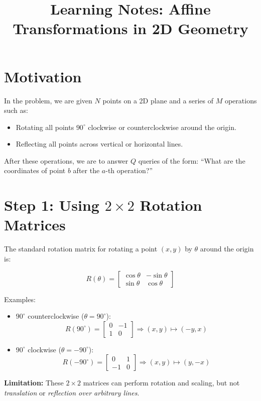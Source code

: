 \documentclass[12pt]{article}
\title{Learning Notes: Affine Transformations in 2D Geometry}
\author{}
\date{}
\begin{document}
\maketitle

\section*{Motivation}
In the problem, we are given $N$ points on a 2D plane and a series of $M$ operations such as:
\begin{itemize}
    \item Rotating all points $90^\circ$ clockwise or counterclockwise around the origin.
    \item Reflecting all points across vertical or horizontal lines.
\end{itemize}
After these operations, we are to answer $Q$ queries of the form: “What are the coordinates of point $b$ after the $a$-th operation?”

\section*{Step 1: Using $2 \times 2$ Rotation Matrices}
The standard rotation matrix for rotating a point $(x, y)$ by $\theta$ around the origin is:

\[
R(\theta) =
\begin{bmatrix}
\cos\theta & -\sin\theta \\
\sin\theta & \cos\theta
\end{bmatrix}
\]

Examples:
\begin{itemize}
    \item $90^\circ$ counterclockwise ($\theta = 90^\circ$):
    \[
    R(90^\circ) = 
    \begin{bmatrix}
    0 & -1 \\
    1 & 0
    \end{bmatrix}
    \Rightarrow (x, y) \mapsto (-y, x)
    \]
    
    \item $90^\circ$ clockwise ($\theta = -90^\circ$):
    \[
    R(-90^\circ) = 
    \begin{bmatrix}
    0 & 1 \\
    -1 & 0
    \end{bmatrix}
    \Rightarrow (x, y) \mapsto (y, -x)
    \]
\end{itemize}

\textbf{Limitation:} These $2 \times 2$ matrices can perform rotation and scaling, but not \emph{translation} or \emph{reflection over arbitrary lines}.
\end{document}

